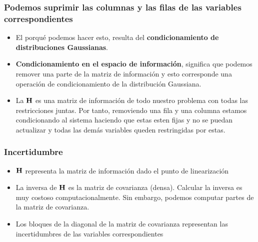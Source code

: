 \begin{frame}
    \frametitle{Podemos suprimir las columnas y las filas de las variables correspondientes}
    
    \begin{itemize}
        \item El porqué podemos hacer esto, resulta del {\bf condicionamiento de distribuciones Gaussianas}.
        \item {\bf Condicionamiento en el espacio de información}, significa que podemos remover una parte de la matriz de información y esto corresponde una operación de condicionamiento de la distribución Gaussiana.
        \item La $\boldsymbol{\mathbf{H}}$ es una matriz de información de todo nuestro problema con todas las restricciones juntas. Por tanto, removiendo una fila y una columna estamos condicionando al sistema haciendo que estas esten fijas y no se puedan actualizar y todas las demás variables queden restringidas por estas.
    \end{itemize}
   
    
\end{frame}

\begin{frame}
    \frametitle{Incertidumbre}
    
    \begin{itemize}
        \item $\boldsymbol{\mathbf{H}}$ representa la matriz de información dado el punto de linearización
        \item La inversa de $\boldsymbol{\mathbf{H}}$ es la matriz de covarianza (densa). Calcular la inversa es muy costoso computacionalmente. Sin embargo, podemos computar partes de la matriz de covarianza.
        \item Los bloques de la diagonal de la matriz de covarianza representan las incertidumbres de las variables correspondientes
    \end{itemize}
\end{frame}

